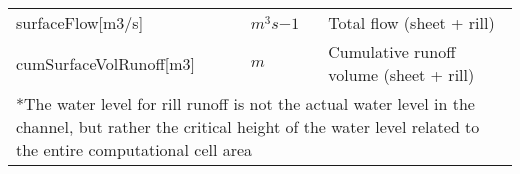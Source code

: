 \begin{table}[t]
\begin{tabular}{llp{}}
 surfaceFlow[m3/s]   &  $m^3s{-1}$ & Total flow (sheet + rill)  \\
 cumSurfaceVolRunoff[m3]   &   $m$  & Cumulative runoff volume (sheet + rill) \\
  \hline
   \hline
   \multicolumn{3}{p{\textwidth}}{*The water level for rill runoff is not the actual water level in the channel, but rather the critical height of the water level related to the entire computational cell area}
 \end{tabular}
 \end{table}


